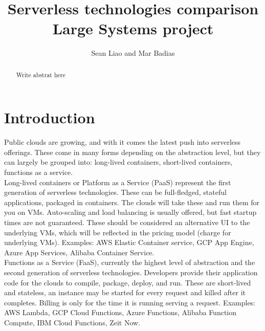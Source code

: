 \documentclass[11pt]{article}
\title{
  Serverless technologies comparison\\
  \large Large Systems project}
\author{Sean Liao and Mar Badias}
\begin{document}
\maketitle




\begin{abstract}
Write abstrat here
\end{abstract}

\newpage

\section{Introduction}
\label{introduction}
Public clouds are growing, and with it comes the latest push into serverless offerings. These come in many forms depending on the abstraction level, but they can largely be grouped into: long-lived containers, short-lived containers, functions as a service. \\

Long-lived containers or Platform as a Service (PaaS) represent the first generation of serverless technologies. These can be full-fledged, stateful applications, packaged in containers. The clouds will take these and run them for you on VMs. Auto-scaling and load balancing is usually offered, but fast startup times are not guaranteed. These should be considered an alternative UI to the underlying VMs, which will be reflected in the pricing model (charge for underlying VMs). Examples: AWS Elastic Container service, GCP App Engine, Azure App Services, Alibaba Container Service. \\

Functions as a Service (FaaS), currently the highest level of abstraction and the second generation of serverless technologies. Developers provide their application code for the clouds to compile, package, deploy, and run. These are short-lived and stateless, an instance may be started for every request and killed after it completes. Billing is only for the time it is running serving a request. Examples: AWS Lambda, GCP Cloud Functions, Azure Functions, Alibaba Function Compute, IBM Cloud Functions, Zeit Now.\\
\end{document}
